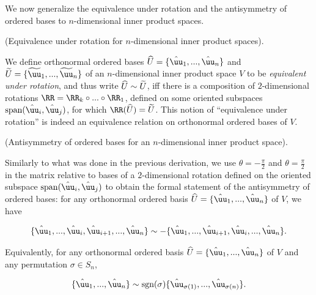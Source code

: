 We now generalize the equivalence under rotation and the antisymmetry of ordered bases to $n$-dimensional inner product spaces.

\begin{defn}
    (Equivalence under rotation for $n$-dimensional inner product spaces).
    
    We define orthonormal ordered bases $\hU = \{\huu_1, ..., \huu_n\}$ and $\tU = \{\tuu_1, ..., \tuu_n\}$ of an $n$-dimensional inner product space $V$ to be \textit{equivalent under rotation}, and thus write $\widehat{U} \sim \widetilde{U}$, iff there is a composition of $2$-dimensional rotations $\RR = \RR_k \circ ... \circ \RR_1$, defined on some oriented subspaces $\spann(\huu_i, \huu_j)$, for which $\RR(\hU) = \tU$. This notion of ``equivalence under rotation'' is indeed an equivalence relation on orthonormal ordered bases of $V$.
\end{defn}

\begin{theorem}
    (Antisymmetry of ordered bases for an $n$-dimensional inner product space).
    
     Similarly to what was done in the previous derivation, we use $\theta = -\frac{\pi}{2}$ and $\theta = \frac{\pi}{2}$ in the matrix relative to bases of a $2$-dimensional  rotation defined on the oriented subspace $\spann(\huu_i, \huu_j)$ to obtain the formal statement of the antisymmetry of ordered bases: for any orthonormal ordered basis $\hU = \{\huu_1, ..., \huu_n\}$ of $V$, we have
    
    \begin{align*}
        \{\huu_1, ..., \huu_i, \huu_{i + 1}, ..., \huu_n\}
        \sim
        -\{\huu_1, ..., \huu_{i + 1}, \huu_i, ..., \huu_n\}.
    \end{align*}
    
    Equivalently, for any orthonormal ordered basis $\hU = \{\huu_1, ..., \huu_n\}$ of $V$ and any permutation $\sigma \in S_n$,
    
    \begin{align*}
        \{\huu_1, ..., \huu_n\}
        \sim
        \sgn(\sigma) \{\huu_{\sigma(1)}, ..., \huu_{\sigma(n)}\}.
    \end{align*}
\end{theorem}

